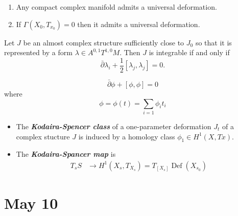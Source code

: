 \begin{thm}[Kuranashi]\leavevmode
	\begin{enumerate}
		\item Any compact complex manifold admits a universal deformation.
		\item If $\Gamma(X_0,T_{x_0})=0$ then it admits a universal deformation.
	\end{enumerate}
\end{thm}
\begin{lemma}
	Let $J$ be an almost complex structure sufficiently close to $J_0$ so that it is represented by a form $\lambda\in A^{0,1}T^{1,0}M$. Then $J$ is integrable if and only if 
	\[\bar{\partial}\lambda_i+\frac{1}{2}[\lambda_j,\lambda_j]=0.\]
\end{lemma}
\begin{thm}
	\[\bar{\partial}\phi+[\phi,\phi]=0\]
	where
	\[\phi=\phi(t)=\sum_{i=1}\phi_it_i\]
\end{thm}
\begin{defn}\leavevmode
	\begin{itemize}
		\item The \textbf{\textit{Kodaira-Spencer class}} of a one-parameter deformation $J_t$ of a complex stucture $J$ is induced by a homology class $\phi_1\in H^1(X,Tx)$.
		\item The \textbf{\textit{Kodaira-Spancer map}} is
		\begin{align*}
			T_sS&\to H^1(X_s,T_{X_s})=T_{[X_s]}\operatorname{ D e f}(X_{s_0})
		\end{align*}
	\end{itemize}
\end{defn}

\section{May 10}
